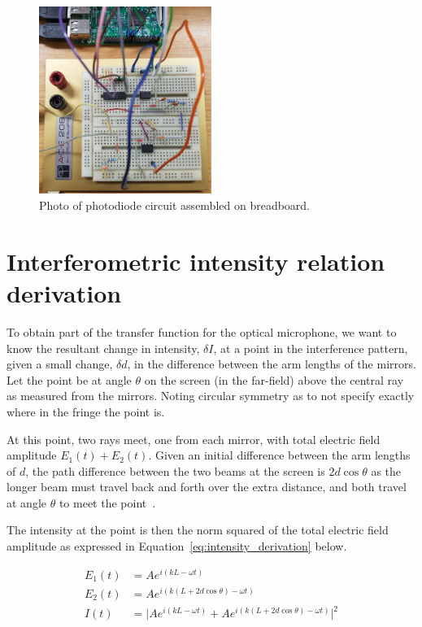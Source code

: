 \documentclass[paper-main.tex]{subfiles}
\begin{document}
\begin{figure}%
	\includegraphics[width=0.5\textwidth]{figures/circuit_pic3.pdf}
	\caption{Photo of photodiode circuit assembled on breadboard.}
	\label{fig:circuit_pic3}
\end{figure}

\section{Interferometric intensity relation derivation}
\label{app:intensity_derivation}

To obtain part of the transfer function for the optical microphone, we want to know the resultant change in intensity, $\delta I$, at a point in the interference pattern, given a small change, $\delta d$, in the difference between the arm lengths of the mirrors. Let the point be at angle $\theta$ on the screen (in the far-field) above the central ray as measured from the mirrors. Noting circular symmetry as to not specify exactly where in the fringe the point is.

At this point, two rays meet, one from each mirror, with total electric field amplitude $E_1(t) + E_2(t)$. Given an initial difference between the arm lengths of $d$, the path difference between the two beams at the screen is $2 d \cos{\theta}$ as the longer beam must travel back and forth over the extra distance, and both travel at angle $\theta$ to meet the point~\cite{fringes:online}.

The intensity at the point is then the norm squared of the total electric field amplitude as expressed in Equation~\ref{eq:intensity_derivation} below.

\begin{align}
    E_1(t) &= A e^{i (k L - \omega t)} \\
    E_2(t) &= A e^{i (k (L + 2 d \cos{\theta}) - \omega t)} \\
    I(t) &= \lvert A e^{i (k L - \omega t)} + A e^{i (k (L + 2 d \cos{\theta}) - \omega t)} \rvert^2
\label{eq:intensity_derivation}    
\end{align}
\end{document}
